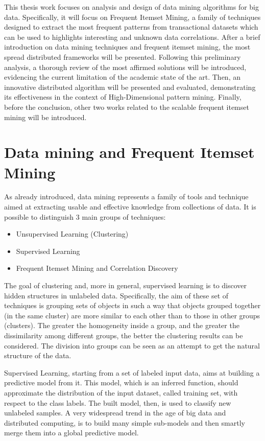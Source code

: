 This thesis work focuses on analysis and design of data mining algorithms for big data. Specifically, it will focus on Frequent Itemset Mining, a family of techniques designed to extract the most frequent patterns from transactional datasets which can be used to highlights interesting and unknown data correlations.
After a brief introduction on data mining techniques and frequent itemset mining, the most spread distributed frameworks will be presented.
Following this preliminary analysis, a thorough review of the most affirmed solutions will be introduced, evidencing the current limitation of the academic state of the art.
Then, an innovative distributed algorithm will be presented and evaluated, demonstrating its effectiveness in the context of High-Dimensional pattern mining.
Finally, before the conclusion, other two works related to the scalable frequent itemset mining will be introduced. 


\section{Data mining and Frequent Itemset Mining}
As already introduced, data mining represents a family of tools and technique aimed at extracting usable and effective knowledge from collections of data. It is possible to distinguish 3 main groups of techniques:
\begin{itemize}
\item Unsupervised Learning (Clustering)
\item Supervised Learning
\item Frequent Itemset Mining and Correlation Discovery
\end{itemize}
The goal of clustering and, more in general, supervised learning is to discover hidden structures in unlabeled data. Specifically, the aim of these set of techniques is grouping sets of objects in such a way that objects grouped together (in the same cluster) are more similar to each other than to those in other groups (clusters). The greater the homogeneity inside a group, and the greater the dissimilarity among different groups, the better the clustering results can be considered. The division into groups can be seen as an attempt to get the natural structure of the data.

Supervised Learning, starting from a set of labeled input data, aims at building a predictive model from it. This model, which is an inferred function, should approximate the distribution of the input dataset, called training set, with respect to the class labels. The built model, then, is used to classify new unlabeled samples. A very widespread trend in the age of big data and distributed computing, is to build many simple sub-models and then smartly merge them into a global predictive model.

